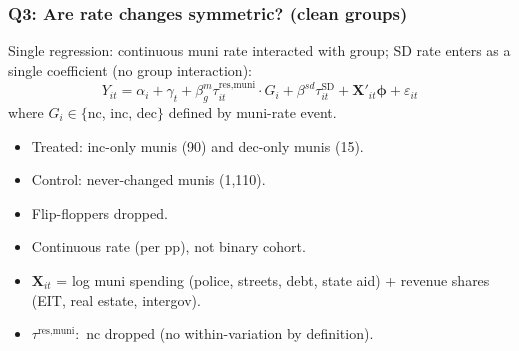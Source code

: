 \documentclass[xcolor = x11names, compress, aspectratio = 169]{beamer}
\renewcommand{\(}{\begin{columns}}
\renewcommand{\)}{\end{columns}}
\newcommand{\<}[1]{\begin{column}{#1}}
\renewcommand{\>}{\end{column}}
\begin{document}
\begin{frame}
\frametitle{Q3: Are rate changes symmetric? (clean groups)}
    Single regression: continuous muni rate interacted with group;
    SD rate enters as a single coefficient (no group interaction):
    \[
    Y_{it} = \alpha_i + \gamma_t
    + \beta^{m}_{g} \tau^{\text{res,muni}}_{it} \cdot G_i
    + \beta^{sd} \tau^{\text{SD}}_{it}
    + \mathbf{X}'_{it}\boldsymbol{\phi} + \varepsilon_{it}
    \]
    where $G_i \in \{$nc, inc, dec$\}$ defined by muni-rate event.
    \footnotesize
    \begin{itemize}
        \item Treated: inc-only munis (90) and dec-only munis (15).
        \item Control: never-changed munis (1{,}110).
        \item Flip-floppers dropped.
        \item Continuous rate (per pp), not binary cohort.
        \item $\mathbf{X}_{it}$ = log muni spending (police, streets,
        debt, state aid) + revenue shares (EIT, real estate, intergov).
        \item $\tau^{\text{res,muni}}:$ nc dropped (no within-variation by definition).
    \end{itemize}
\end{frame}
\end{document}
